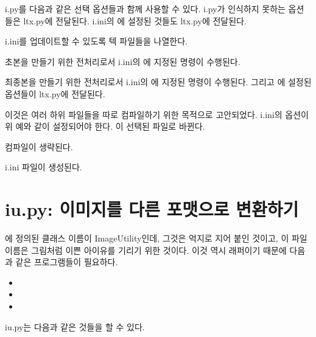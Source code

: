 i.py를 다음과 같은 선택 옵션들과 함께 사용할 수 있다. i.py가 인식하지 못하는 옵션들은 ltx.py에 전달된다.
i.ini의 에 설정된 것들도 ltx.py에 전달된다.

\begin{macros}
\item[-U] i.ini를 업데이트할 수 있도록 텍 파일들을 나열한다.

\item[-D] 초본을 만들기 위한 전처리로서 i.ini의 에 지정된 명령이 수행된다.

\item[-F] 최종본을 만들기 위한 전처리로서 i.ini의 에 지정된 명령이 수행된다.
그리고 에 설정된 옵션들이 ltx.py에 전달된다.

\item[-W] 이것은 여러 하위 파일들을 따로 컴파일하기 위한 목적으로 고안되었다.
i.ini의  옵션이 위 예와 같이 설정되어야 한다. 
\macro*{\1}이 선택된 파일로 바뀐다.

\item[-N] 컴파일이 생략된다.

\item[-C] i.ini 파일이 생성된다.
\end{macros}

\section{iu.py: 이미지를 다른 포맷으로 변환하기}

에 정의된 클래스 이름이 ImageUtility인데, 그것은 억지로 지어 붙인 것이고, 이 파일 이름은 그림처럼 이쁜 아이유를 기리기 위한 것이다.
이것 역시 래퍼이기 때문에 다음과 같은 프로그램들이 필요하다.

\begin{itemize}*
\item {}
\item {}
\item {}
\end{itemize}

iu.py는 다음과 같은 것들을 할 수 있다.

